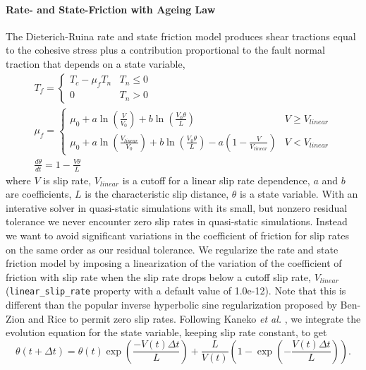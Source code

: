 \paragraph{Rate- and State-Friction with Ageing Law}
\label{sec:friction:rate:state:ageing}

The Dieterich-Ruina rate and state friction model produces shear tractions
equal to the cohesive stress plus a contribution proportional to the
fault normal traction that depends on a state variable,
\begin{gather}
T_{f}=\begin{cases}
T_{c}-\mu_{f}T_{n} & T_{n}\leq0\\
0 & T_{n}>0
\end{cases}\\
\mu_{f}=\begin{cases}
\mu_{0}+a\ln\left(\frac{V}{V_{0}}\right)+b\ln\left(\frac{V_{0}\theta}{L}\right) & V\ge V_{\mathit{linear}}\\
\mu_{0}+a\ln\left(\frac{V_{linear}}{V_{0}}\right)+b\ln\left(\frac{V_{0}\theta}{L}\right)-a\left(1-\frac{V}{V_{linear}}\right) & V<V_{linear}
\end{cases}\\
\frac{d\theta}{dt}=1-\frac{V\theta}{L}
\end{gather}
where $V$ is slip rate, $V_{linear}$ is a cutoff for a linear slip
rate dependence, $a$ and $b$ are coefficients, $L$ is the characteristic
slip distance, $\theta$ is a state variable. With an interative solver
in quasi-static simulations with its small, but nonzero residual tolerance
we never encounter zero slip rates in quasi-static simulations. Instead
we want to avoid significant variations in the coefficient of friction
for slip rates on the same order as our residual tolerance. We regularize
the rate and state friction model by imposing a linearization of the
variation of the coefficient of friction with slip rate when the slip
rate drops below a cutoff slip rate, $V_{linear}$ (\texttt{linear\_slip\_rate}
property with a default value of 1.0e-12). Note that this is different
than the popular inverse hyperbolic sine regularization proposed by
Ben-Zion and Rice \cite{BenZion:Rice:1997} to permit zero slip rates.
Following Kaneko \textit{et al.} \cite{Kaneko:etal:2008}, we integrate
the evolution equation for the state variable, keeping slip rate constant,
to get
\begin{equation}
\theta(t+\Delta t)=\theta(t)\exp\left(\frac{-V(t)\Delta t}{L}\right)+\frac{L}{V(t)}\left(1-\exp\left(-\frac{V(t)\Delta t}{L}\right)\right).
\end{equation}
